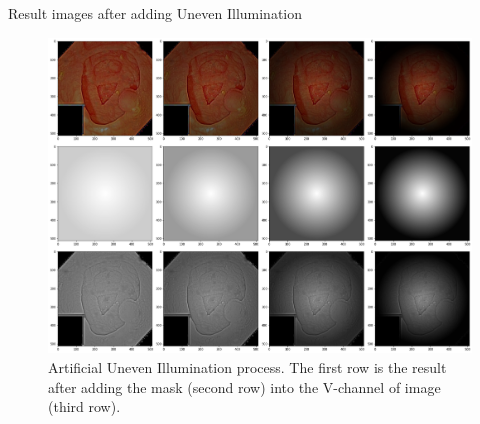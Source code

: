 \documentclass{libs/ufc_format}
\begin{document}
\begin{frame}{Result images after adding Uneven Illumination}









    \begin{figure}[h]
        \begin{center}
            \includegraphics[width=0.8\columnwidth]{libs/unevencreate.png}
            \caption{Artificial Uneven Illumination process. The first row is the result after adding the mask (second row) into the V-channel of image (third row).}
        \end{center}
    \end{figure}
\end{frame}
\end{document}
